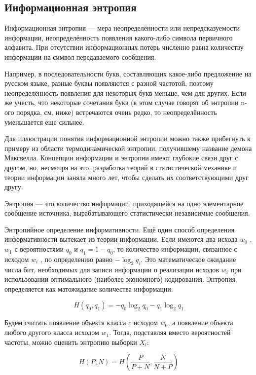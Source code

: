 \subsection{Информационная энтропия}

Информационная энтропия — мера неопределённости или непредсказуемости информации, неопределённость появления какого-либо символа первичного алфавита. При отсутствии информационных потерь численно равна количеству информации на символ передаваемого сообщения.

Например, в последовательности букв, составляющих какое-либо предложение на русском языке, разные буквы появляются с разной частотой, поэтому неопределённость появления для некоторых букв меньше, чем для других. Если же учесть, что некоторые сочетания букв (в этом случае говорят об энтропии n-ого порядка, см. ниже) встречаются очень редко, то неопределённость уменьшается еще сильнее.

Для иллюстрации понятия информационной энтропии можно также прибегнуть к примеру из области термодинамической энтропии, получившему название демона Максвелла. Концепции информации и энтропии имеют глубокие связи друг с другом, но, несмотря на это, разработка теорий в статистической механике и теории информации заняла много лет, чтобы сделать их соответствующими друг другу.

Энтропия — это количество информации, приходящейся на одно элементарное сообщение источника, вырабатывающего статистически независимые сообщения.

Энтропийное определение информативности. Ещё один способ определения информативности вытекает из теории информации. Если имеются два исхода $w_0$ , $w_1$ с вероятностями $q_0$ и $q_1=1-q_0$, то количество информации, связанное с исходом $w_i$ , по определению равно $-\log_2 q_i$. Это математическое ожидание числа бит, необходимых для записи информации о реализации исходов $w_i$ при использовании оптимального (наиболее экономного) кодирования. Энтропия определяется как матожидание количества информации:

\begin{equation}
	H(q_0,q_1)=-q_0\log_2 q_0-q_1\log_2 q_1
\end{equation}

Будем считать появление объекта класса $c$ исходом $w_0$, а появление объекта любого другого класса исходом $w_1$. Тогда, подставляя вместо вероятностей частоты, можно оценить энтропию выборки $X_l$:

\begin{equation}
	H(P,N)=H(\frac{P}{P+N},\frac{N}{N+P})
\end{equation}

